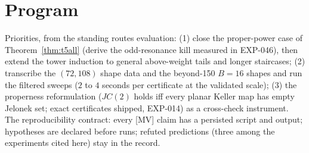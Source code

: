 \documentclass[11pt]{article}
\theoremstyle{remark}
\begin{document}
\section{Program}

Priorities, from the standing routes evaluation: (1) close the proper-power case of
Theorem~\ref{thm:t5all} (derive the odd-resonance kill measured in EXP-046), then extend
the tower induction to general above-weight tails and longer staircases; (2) transcribe
the $(72, 108)$ shape data and the beyond-150 $B = 16$ shapes and run the filtered
sweeps ($2$ to $4$ seconds per certificate at the validated scale); (3) the properness
reformulation ($JC(2)$ holds iff every planar Keller map has empty Jelonek set; exact
certificates shipped, EXP-014) as a cross-check instrument. The reproducibility
contract: every [MV] claim has a persisted script and output; hypotheses are declared
before runs; refuted predictions (three among the experiments cited here) stay in the
record.
\end{document}
